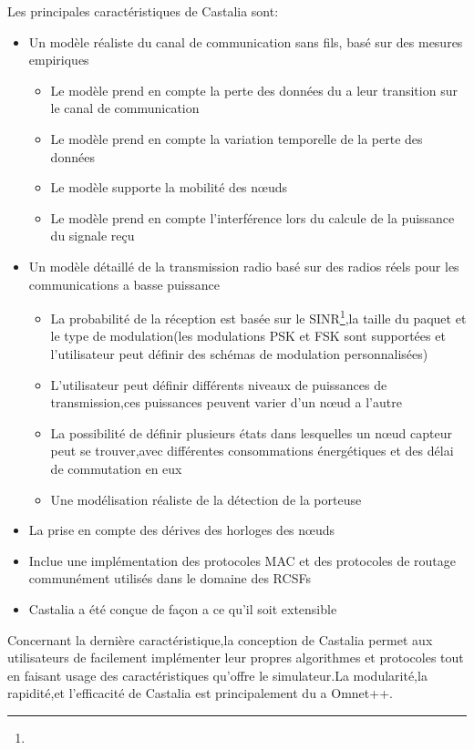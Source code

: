 Les principales caractéristiques de Castalia sont:

\begin{itemize}
\item Un modèle réaliste du canal de communication sans fils, basé sur des mesures empiriques
 	\begin{itemize}
 	\item Le modèle prend en compte la perte des 		   		  données du a leur transition sur le canal de			  communication
	\item Le modèle prend en compte la variation 				  temporelle de la perte des données
	\item Le modèle supporte la mobilité des nœuds
	\item Le modèle prend en compte l'interférence lors 		  du calcule de la puissance du signale reçu   
 	\end{itemize}
\item Un modèle détaillé de la transmission  radio basé sur des radios réels pour les communications a basse puissance
	\begin{itemize}
		
	\item La probabilité de la réception est basée sur le SINR\footnote{},la taille du paquet et le type de modulation(les modulations PSK et FSK sont supportées et l'utilisateur peut définir des schémas de modulation personnalisées)
	\item L'utilisateur peut définir différents niveaux de puissances de transmission,ces puissances peuvent varier d'un nœud a l'autre
	\item La possibilité de définir plusieurs états dans lesquelles un nœud capteur peut se trouver,avec différentes consommations énergétiques et des délai de commutation en eux
	\item Une modélisation réaliste de la détection de la porteuse  
	\end{itemize}
\item La prise en compte des dérives des horloges des nœuds
\item Inclue une implémentation des protocoles MAC et des protocoles de routage communément utilisés dans le domaine des RCSFs
\item Castalia a été conçue de façon a ce qu'il soit extensible
\end{itemize}

Concernant la dernière caractéristique,la conception de Castalia permet aux utilisateurs de facilement implémenter leur propres algorithmes et protocoles tout en faisant usage des caractéristiques qu'offre le simulateur.La modularité,la rapidité,et l'efficacité de Castalia est principalement du a Omnet++.

